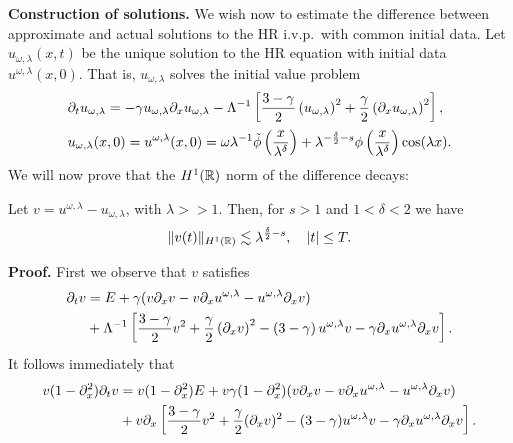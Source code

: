 \textbf{Construction of  solutions.}
We wish now to estimate the difference between approximate and actual 
solutions to
the HR i.v.p.\ with common initial data. Let
$u_{\omega,\lambda}(x,t)$ be the unique solution to the HR equation
with initial data $u^{\omega,\lambda}(x,0)$. That is,
$u_{\omega,\lambda}$ solves the initial value problem
\begin{align}
& \partial_t u_{\omega,\lambda} = - \gamma u_{\omega,\lambda} \partial_x 
u_{\omega,\lambda} - \Lambda^{-1} \left[
\frac{3- \gamma}{2}\left( u_{\omega,\lambda} \right)^2 + 
\frac{\gamma}{2}\left(
\partial_x u_{\omega,\lambda} \right)^2
\right], \label{apple50}
\\
& u_{\omega,\lambda}(x, 0) = u^{\omega,\lambda}(x,0) = \omega \lambda^{-1}
\tilde{\phi} \left( \frac{x}{\lambda^\delta} \right)
+ \lambda^{-\frac{\delta}{2} -s}
\phi\left( \frac{x}{\lambda^\delta} \right) \cos(\lambda x).
\label{apple41}
\end{align}
%
%
%
We will now prove that the $H^1(\mathbb{R})$ norm of the difference decays: 
%
%
%
%
%
%
%
%
%
%
%
%
%
%
%
\begin{proposition}
\label{applelem:bound_for_difference-of-approx-and-actual-soln}
%
Let $v = u^{\omega,\lambda} - u_{\omega,\lambda}$, with $\lambda >>1$.
Then, for $s > 1$ and $1<\delta<2$ we have
%
%
\begin{equation} \|
v(t)
\|_{H^1(\mathbb{R})}
\lesssim \lambda^{\frac{\delta}{2} -s}, \quad
|t| \le T.
\end{equation}
%
%
\end{proposition}
%
%
\textbf{Proof.}  First we observe that $v$ satisfies 
%
%
\begin{equation*}
\begin{split}
\partial_t v & = E + \gamma(v \partial_x v - v \partial_x u^{\omega,\lambda} - 
u^{\omega,\lambda} \partial_x v) \\
& + \Lambda^{-1}  \left[ \frac{3-
\gamma}{2}v^2 + \frac{\gamma}{2}\left( \partial_x v \right)^2 - \left(
3 - \gamma \right)u^{\omega,\lambda} v -
\gamma \partial_x u^{\omega,\lambda} \partial_x v \right].
\end{split}
\end{equation*}
It follows immediately that
\begin{equation}
\label{applev-dtv-pseudo-functional-equalityu}
\begin{split}
v(1-\partial_x^2)\partial_t v &= v(1- \partial_x^2)E + v\gamma(1- \partial_x^2)(v\partial_x v 
- v\partial_x u^{\omega,\lambda} -
u^{\omega,\lambda} \partial_x v)
\\
&+ v\partial_x \left[ \frac{3-\gamma}{2}v^2 + \frac{\gamma}{2}(\partial_x v)^2 -
(3-\gamma)u^{\omega,\lambda} v - \gamma \partial_x u^{\omega,\lambda} \partial_x v \right].
\end{split}
\end{equation}
